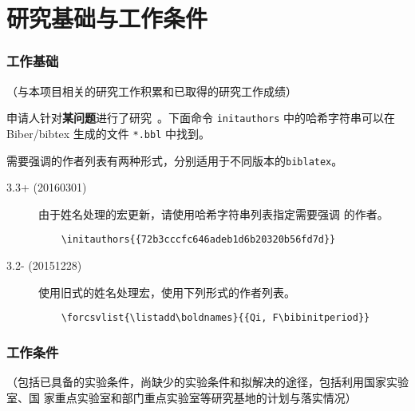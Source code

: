 \documentclass[subfig,boldtoc]{mynsfc}
\begin{document}
\part{研究基础与工作条件}
\label{sec:preparation}


\section{工作基础}
\label{sec:previous-work}

\begin{hcomment}
  （与本项目相关的研究工作积累和已取得的研究工作成绩）
\end{hcomment}


\begin{refsection}

  申请人针对\textbf{某问题}进行了研究~\cite{xia_saliency_2015}。下面命令
  \texttt{initauthors} 中的哈希字符串可以在Biber/bibtex 生成的文件
  \texttt{*.bbl} 中找到。

  需要强调的作者列表有两种形式，分别适用于不同版本的\texttt{biblatex}。
  \begin{description}
  \item[3.3+ (20160301)] 由于姓名处理的宏更新，请使用哈希字符串列表指定需要强调
    的作者。
\begin{verbatim}
    \initauthors{{72b3cccfc646adeb1d6b20320b56fd7d}}
\end{verbatim}
  \item[3.2- (20151228)] 使用旧式的姓名处理宏，使用下列形式的作者列表。
\begin{verbatim}
    \forcsvlist{\listadd\boldnames}{{Qi, F\bibinitperiod}}
\end{verbatim}
  \end{description}


  \printbibliography[prefixnumbers=J,heading=cvtype,title={相关工作}]

\end{refsection}

\section{工作条件}
\label{sec:devices-laboratory}

\begin{hcomment}
  （包括已具备的实验条件，尚缺少的实验条件和拟解决的途径，包括利用国家实验室、国
  家重点实验室和部门重点实验室等研究基地的计划与落实情况）
\end{hcomment}
\end{document}
